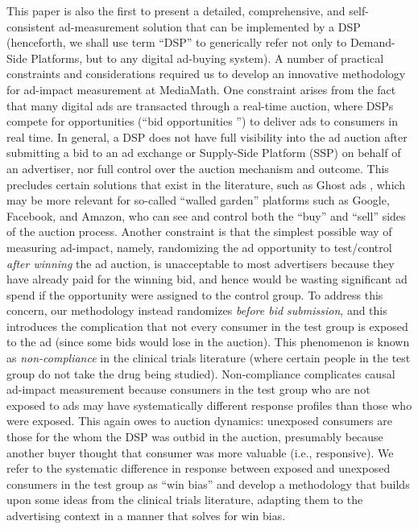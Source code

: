 \documentclass[11pt,a4paper]{article}
\theoremstyle{definition}
\theoremstyle{remark}
\theoremstyle{definition}
\theoremstyle{definition}
\theoremstyle{definition}
\theoremstyle{definition}
\theoremstyle{definition}
\theoremstyle{definition}
\begin{document}
This paper is also the first to present a detailed, comprehensive, and self-consistent ad-measurement solution that can be implemented by a DSP (henceforth, we shall use term “DSP” to generically refer not only to Demand-Side Platforms, but to any digital ad-buying system).
A number of practical constraints and considerations required us to develop an innovative methodology for ad-impact measurement at MediaMath. One constraint arises from the fact that many digital ads are transacted through a real-time auction, where DSPs compete for opportunities (“bid opportunities ”) to deliver ads to consumers in real time. 
In general, a DSP does not have full visibility into the ad auction after submitting a bid to an ad exchange or Supply-Side Platform (SSP) on behalf of an advertiser, nor full control over the auction mechanism and outcome. 
This precludes certain solutions that exist in the literature, such as Ghost ads \cite{Johnson_Ghost_2015}, which may be more relevant for so-called “walled garden” platforms such as Google, Facebook, and Amazon, who can see and control both the “buy” and “sell” sides of the auction process. 
Another constraint is that the simplest possible way of measuring ad-impact, namely, randomizing the ad opportunity to test/control \textit{after winning} the ad auction, is unacceptable to most advertisers because they have already paid for the winning bid, and hence would be wasting significant ad spend if the opportunity were assigned to the control group. 
To address this concern, our methodology instead randomizes \textit{before bid submission}, and this introduces the complication that not every consumer in the test group is exposed to the ad (since some bids would lose in the auction). 
This phenomenon is known as \textit{non-compliance} in the clinical trials literature (where certain people in the test group do not take the drug being studied). 
Non-compliance complicates causal ad-impact measurement because consumers in the test group who are not exposed to ads may have systematically different response profiles than those who were exposed. This again owes to auction dynamics: unexposed consumers are those for the whom the DSP was outbid in the auction, presumably because another buyer thought that consumer was more valuable (i.e., responsive). We refer to the systematic difference in response between exposed and unexposed consumers in the test group as “win bias” and develop a methodology that builds upon some ideas from the clinical trials literature, adapting them to the advertising context in a manner that solves for win bias.
\end{document}
